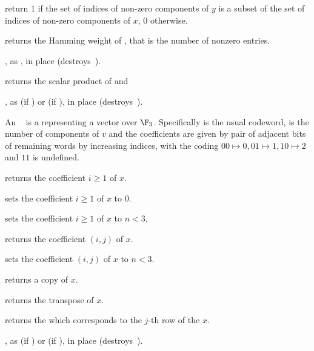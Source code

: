  return $1$ if the set of indices of
non-zero components of $y$ is a subset of the set of indices of
non-zero components of $x$, $0$ otherwise.

 returns the Hamming weight of , that is
the number of nonzero entries.


, as , in place (destroys~).


 returns the scalar product of 
and 



, as  (if
) or  (if ), in place
(destroys~).

  An ~ is a
 representing a vector over $\F_3$. Specifically  is
the usual codeword,  is the number of components of $v$ and the
coefficients are given by pair of adjacent bits of remaining words by
increasing indices, with the coding $00\mapsto 0, 01\mapsto 1, 10\mapsto 2$ and
$11$ is undefined.

 returns the coefficient $i\ge 1$ of $x$.

 sets the coefficient $i\ge 1$ of $x$ to
$0$.

 sets the coefficient $i\ge 1$ of
$x$ to $n<3$,

 returns the coefficient $(i,j)$
of $x$.

 sets the coefficient
$(i,j)$ of $x$ to $n<3$.

 returns a copy of $x$.

 returns the transpose of $x$.

 returns the  which corresponds
to the $j$-th row of the  $x$.


, as  (if
) or  (if ), in place
(destroys~).

